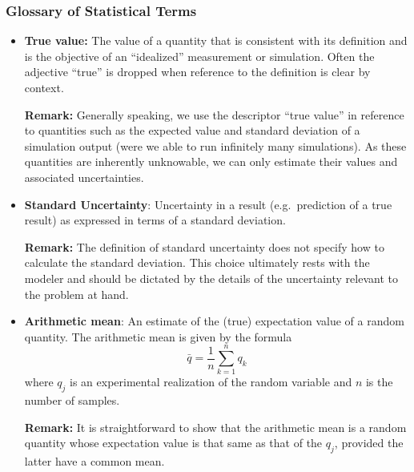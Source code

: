 \subsubsection{Glossary of Statistical Terms}
\begin{itemize}

\item {\bf True value:}  The value of a quantity that is consistent with its definition and is the objective of an ``idealized'' measurement or simulation.  Often the adjective ``true'' is dropped when reference to the definition is clear by context.  \cite{JCGM:GUM2008,JCGM:VIM2012}

\medskip

{\bf Remark:} Generally speaking, we use the descriptor ``true value'' in reference to quantities such as the expected value and standard deviation of a simulation output (were we able to run infinitely many simulations).  As these quantities are inherently unknowable, we can only estimate their values and associated uncertainties.


\item {\bf Standard Uncertainty}: Uncertainty in a result (e.g.\ prediction of a true result) as expressed in terms of a standard deviation.

\medskip 

{\bf Remark:} The definition of standard uncertainty does not specify how to calculate the standard deviation.  This choice ultimately rests with the modeler and should be dictated by the details of the uncertainty relevant to the problem at hand.  

\item {\bf Arithmetic mean}: An estimate of the (true) expectation value of a random quantity. The arithmetic mean is given by the formula
  \begin{equation}
    \bar{q} = \dfrac{1}{n} \sum_{k=1}^{n} q_k \label{def:arith_mean}
  \end{equation}
  where $q_j$ is an experimental realization of the random variable and $n$ is the number of samples. 

\medskip 

{\bf Remark:} It is straightforward to show that the arithmetic mean is a random quantity whose expectation value is that same as that of the $q_j$, provided the latter have a common mean.   


\end{itemize}
